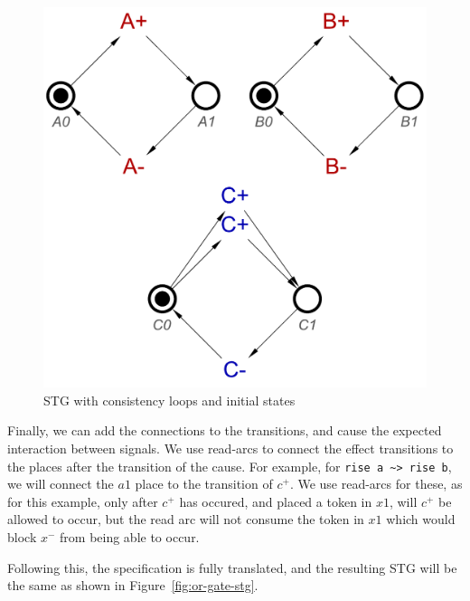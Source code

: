 \documentclass[british,conference,compsoc]{IEEEtran}
\begin{document}
\begin{figure}[h]
\vspace{-4mm}
\begin{centering}
\includegraphics[scale=0.3]{Images/or-gate-inits-stg}
\par\end{centering}
\protect\caption{\label{fig:tokens} STG with consistency loops and 
			initial states}
\vspace{-1mm}
\end{figure}

Finally, we can add the connections to the transitions, and cause the 
expected interaction between signals. We use read-arcs to connect the effect
transitions to the places after the transition of the cause. For example, for
\lstinline{rise a ~> rise b}, we will connect the $a1$ place to the 
transition of $c^{+}$. We use read-arcs for these, as for this example, only
after $c^{+}$ has occured, and placed a token in $x1$, will $c^{+}$ be allowed
to occur, but the read arc will not consume the token in $x1$ which would block
$x^{-}$ from being able to occur. 

Following this, the specification is fully translated, and the resulting STG 
will be the same as shown in Figure~\ref{fig:or-gate-stg}.
\end{document}
